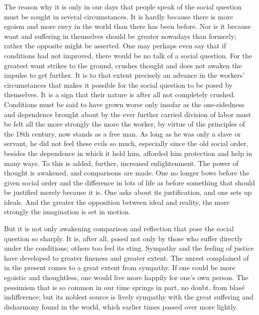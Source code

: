 \documentclass[12pt,a4paper,openany]{book}
\newcommand{\opage}[1]{\marginnote{\footnotesize\textit{[#1]}}}
\begin{document}
The reason why it is only in our days that people speak of the social question must be sought in several circumstances.
It is hardly because there is more egoism and more envy in the world than there has been before. Nor is it because want
and suffering in themselves should be greater nowadays than formerly; rather the opposite might be asserted. One may
perhaps even say that if conditions had not improved, there would be no talk of a social question. For the greatest want
strikes to the ground, crushes thought and does not awaken the impulse to get further. It is to that extent precisely an
advance in the workers' circumstances that makes it possible for the social question to be posed by themselves. It is a
sign that their nature is after all not completely crushed. Conditions must be said to have grown worse only insofar as
the one-sidedness and dependence brought about by the ever further carried division of labor must be felt all the more
strongly the more the worker, by virtue of the principles of the 18th century, now stands as a free man. As long as he was
only a slave or servant, he did not feel these evils so much, especially since the old social order, besides the
dependence in which it held him, afforded him protection and help in many ways. To this is added, further, increased
enlightenment. The power of thought is awakened, and comparisons are made. One no longer bows before the given social
order and the difference in lots of life as before something that should be justified merely because it is. One asks
about its justification, and one sets up ideals. And the greater the opposition between ideal and reality, the more
strongly the imagination is set in motion.

But it is not only awakening comparison and reflection that pose the social question so sharply. It is, after all, posed
not only by those who suffer directly under the conditions; others too feel its sting. Sympathy and the feeling of justice
\opage{366}have developed to greater fineness and greater extent. The unrest complained of in the present comes to a
great extent from sympathy. If one could be more egoistic and thoughtless, one would live more happily for one's own
person. The pessimism that is so common in our time springs in part, no doubt, from blasé indifference; but its noblest
source is lively sympathy with the great suffering and disharmony found in the world, which earlier times passed over
more lightly.
\end{document}
